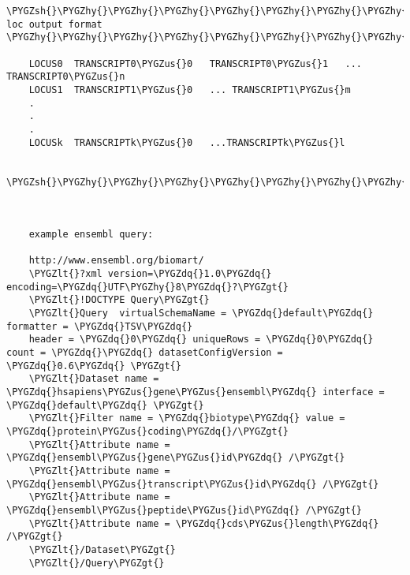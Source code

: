 \documentclass[letterpaper,10pt,english]{sphinxmanual}
\def\PYGZus{\char`\_}
\def\PYGZlt{\char`\<}
\def\PYGZgt{\char`\>}
\def\PYGZsh{\char`\#}
\def\PYGZhy{\char`\-}
\def\PYGZdq{\char`\"}
\begin{document}
\begin{Verbatim}[commandchars=\\\{\}]
    \PYGZsh{}\PYGZhy{}\PYGZhy{}\PYGZhy{}\PYGZhy{}\PYGZhy{}\PYGZhy{}\PYGZhy{}\PYGZhy{}\PYGZhy{}\PYGZhy{}\PYGZhy{}\PYGZhy{} loc output format \PYGZhy{}\PYGZhy{}\PYGZhy{}\PYGZhy{}\PYGZhy{}\PYGZhy{}\PYGZhy{}\PYGZhy{}\PYGZhy{}\PYGZhy{}\PYGZhy{}\PYGZhy{}\PYGZhy{}\PYGZhy{}\PYGZhy{}\PYGZhy{}\PYGZhy{}\PYGZhy{}\PYGZhy{}\PYGZhy{}\PYGZhy{}\PYGZhy{}\PYGZhy{}\PYGZhy{}\PYGZhy{}\PYGZhy{}\PYGZhy{}\PYGZsh{}

    LOCUS0	TRANSCRIPT0\PYGZus{}0	TRANSCRIPT0\PYGZus{}1	...	TRANSCRIPT0\PYGZus{}n
    LOCUS1	TRANSCRIPT1\PYGZus{}0	...	TRANSCRIPT1\PYGZus{}m
    .
    .
    .
    LOCUSk	TRANSCRIPTk\PYGZus{}0	...TRANSCRIPTk\PYGZus{}l

    \PYGZsh{}\PYGZhy{}\PYGZhy{}\PYGZhy{}\PYGZhy{}\PYGZhy{}\PYGZhy{}\PYGZhy{}\PYGZhy{}\PYGZhy{}\PYGZhy{}\PYGZhy{}\PYGZhy{}\PYGZhy{}\PYGZhy{}\PYGZhy{}\PYGZhy{}\PYGZhy{}\PYGZhy{}\PYGZhy{}\PYGZhy{}\PYGZhy{}\PYGZhy{}\PYGZhy{}\PYGZhy{}\PYGZhy{}\PYGZhy{}\PYGZhy{}\PYGZhy{}\PYGZhy{}\PYGZhy{}\PYGZhy{}\PYGZhy{}\PYGZhy{}\PYGZhy{}\PYGZhy{}\PYGZhy{}\PYGZhy{}\PYGZhy{}\PYGZhy{}\PYGZhy{}\PYGZhy{}\PYGZhy{}\PYGZhy{}\PYGZhy{}\PYGZhy{}\PYGZhy{}\PYGZhy{}\PYGZhy{}\PYGZhy{}\PYGZhy{}\PYGZhy{}\PYGZhy{}\PYGZhy{}\PYGZhy{}\PYGZhy{}\PYGZhy{}\PYGZhy{}\PYGZhy{}\PYGZsh{}

    

    example ensembl query:

    http://www.ensembl.org/biomart/
    \PYGZlt{}?xml version=\PYGZdq{}1.0\PYGZdq{} encoding=\PYGZdq{}UTF\PYGZhy{}8\PYGZdq{}?\PYGZgt{}
    \PYGZlt{}!DOCTYPE Query\PYGZgt{}
    \PYGZlt{}Query  virtualSchemaName = \PYGZdq{}default\PYGZdq{} formatter = \PYGZdq{}TSV\PYGZdq{}
    header = \PYGZdq{}0\PYGZdq{} uniqueRows = \PYGZdq{}0\PYGZdq{} count = \PYGZdq{}\PYGZdq{} datasetConfigVersion = \PYGZdq{}0.6\PYGZdq{} \PYGZgt{}
    \PYGZlt{}Dataset name = \PYGZdq{}hsapiens\PYGZus{}gene\PYGZus{}ensembl\PYGZdq{} interface = \PYGZdq{}default\PYGZdq{} \PYGZgt{}
    \PYGZlt{}Filter name = \PYGZdq{}biotype\PYGZdq{} value = \PYGZdq{}protein\PYGZus{}coding\PYGZdq{}/\PYGZgt{}
    \PYGZlt{}Attribute name = \PYGZdq{}ensembl\PYGZus{}gene\PYGZus{}id\PYGZdq{} /\PYGZgt{}
    \PYGZlt{}Attribute name = \PYGZdq{}ensembl\PYGZus{}transcript\PYGZus{}id\PYGZdq{} /\PYGZgt{}
    \PYGZlt{}Attribute name = \PYGZdq{}ensembl\PYGZus{}peptide\PYGZus{}id\PYGZdq{} /\PYGZgt{}
    \PYGZlt{}Attribute name = \PYGZdq{}cds\PYGZus{}length\PYGZdq{} /\PYGZgt{}
    \PYGZlt{}/Dataset\PYGZgt{}
    \PYGZlt{}/Query\PYGZgt{}
    


\end{Verbatim}
\end{document}
